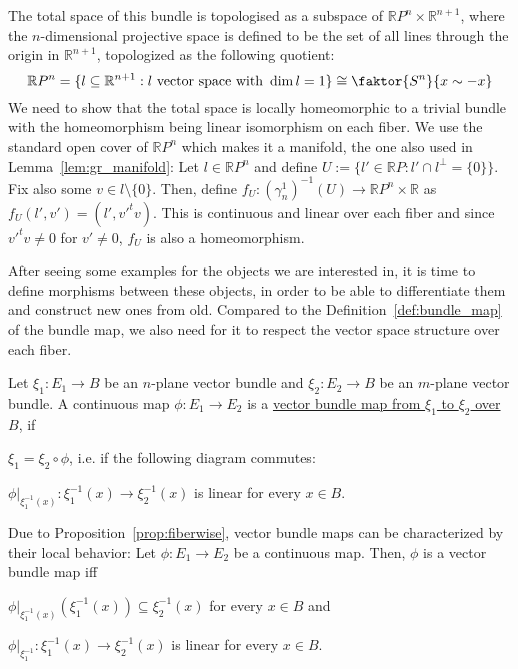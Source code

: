 \begin{examples}
\begin{i_enum}
\begin{center}
\end{center}
The total space of this bundle is topologised as a subspace of $\mathbb{R}P^n\times\mathbb{R}^{n+1}$, where the $n$-dimensional projective space is defined to be the set of all lines through the origin in $\mathbb{R}^{n+1}$, topologized as the following quotient:
\[\mathbb{R}P^n=\{l\subseteq\mathbb{R}^{n+1}:l\text{ vector space with }\dim l=1\}\cong\faktor{S^n}{x\sim-x}\]
We need to show that the total space is locally homeomorphic to a trivial bundle with the homeomorphism being linear isomorphism on each fiber. We use the standard open cover of $\mathbb{R}P^n$ which makes it a manifold, the one also used in Lemma~\ref{lem:gr_manifold}: Let $l\in\mathbb{R}P^n$ and define $U:=\{l'\in\mathbb{R}P:l'\cap l^{\perp}=\{0\}\}$. Fix also some $v\in l\setminus\{0\}$. Then, define $f_U:(\gamma_n^1)^{-1}(U)\to\mathbb{R}P^n\times\mathbb{R}$ as
$f_U(l',v')=(l',v'^tv)$.
This is continuous and linear over each fiber and since $v'^tv\neq0$ for $v'\neq0$, $f_U$ is also a homeomorphism.
\end{i_enum}
\end{examples}

After seeing some examples for the objects we are interested in, it is time to define morphisms between these objects, in order to be able to differentiate them and construct new ones from old. Compared to the Definition~\ref{def:bundle_map} of the bundle map, we also need for it to respect the vector space structure over each fiber.

\begin{definition}
Let $\xi_1:E_1\to B$ be an $n$-plane vector bundle and $\xi_2:E_2\to B$ be an $m$-plane vector bundle. A continuous map $\phi:E_1\to E_2$ is a \ul{vector bundle map from $\xi_1$ to $\xi_2$ over $B$}, if
\begin{i_enum}
\item $\xi_1=\xi_2\circ\phi$, i.e. if the following diagram commutes:
\begin{center}
\end{center}
\item $\phi|_{\xi_1^{-1}(x)}:\xi_1^{-1}(x)\to\xi_2^{-1}(x)$ is linear for every $x\in B$.
\end{i_enum}
\end{definition}
\begin{remark} Due to Proposition~\ref{prop:fiberwise}, vector bundle maps can be characterized by their local behavior: Let $\phi:E_1\to E_2$ be a continuous map. Then, $\phi$ is a vector bundle map iff
\begin{i_enum}
\item $\phi|_{\xi_1^{-1}(x)}(\xi_1^{-1}(x))\subseteq\xi_2^{-1}(x)$ for every $x\in B$ and
\item $\phi|_{\xi_1^{-1}}:\xi_1^{-1}(x)\to\xi_2^{-1}(x)$ is linear for every $x\in B$.
\end{i_enum}
\end{remark}

